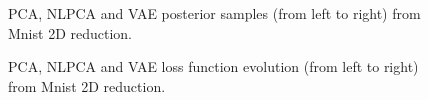 \begin{figure}
  \centering
   \caption{PCA, NLPCA and VAE posterior samples (from left to right) from Mnist 2D reduction.}\label{fig:mnist_posterior_2D}
\end{figure}
\begin{figure}
  \centering
   \caption{PCA, NLPCA and VAE loss function evolution (from left to right) from Mnist 2D reduction.}\label{fig:mnist_loss_2D}
\end{figure}

